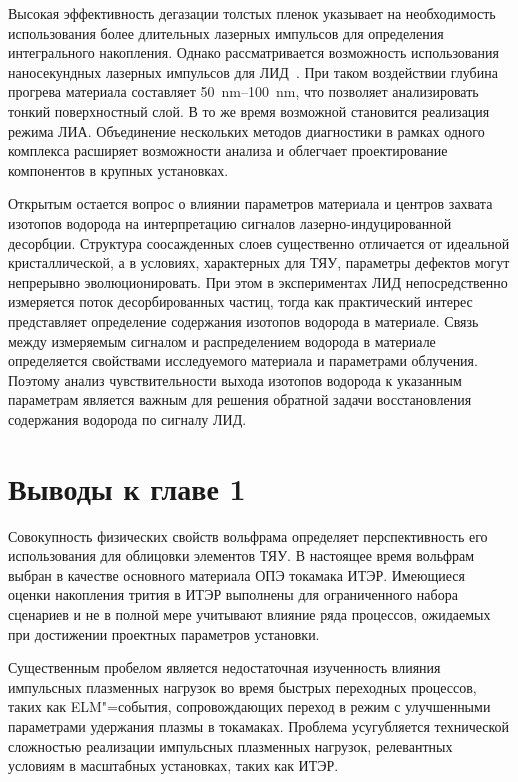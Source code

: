 Высокая эффективность дегазации толстых пленок указывает на необходимость использования более длительных лазерных импульсов для определения интегрального накопления. Однако рассматривается возможность использования наносекундных лазерных импульсов для ЛИД~\cite{Medvedev2024, Gasparyan2021, Efimov2024}. При таком воздействии глубина прогрева материала составляет \SIrange{50}{100}{\nano\meter}, что позволяет анализировать тонкий поверхностный слой. В то же время возможной становится реализация режима ЛИА. Объединение нескольких методов диагностики в рамках одного комплекса расширяет возможности анализа и облегчает проектирование компонентов в крупных установках.

Открытым остается вопрос о влиянии параметров материала и центров захвата изотопов водорода на интерпретацию сигналов лазерно-индуцированной десорбции. Структура соосажденных слоев существенно отличается от идеальной кристаллической, а в условиях, характерных для ТЯУ, параметры дефектов могут непрерывно эволюционировать. При этом в экспериментах ЛИД непосредственно измеряется поток десорбированных частиц, тогда как практический интерес представляет определение содержания изотопов водорода в материале. Связь между измеряемым сигналом и распределением водорода в материале определяется свойствами исследуемого материала и параметрами облучения. Поэтому анализ чувствительности выхода изотопов водорода к указанным параметрам является важным для решения обратной задачи восстановления содержания водорода по сигналу ЛИД.

\section{Выводы к главе 1}

Совокупность физических свойств вольфрама определяет перспективность его использования для облицовки элементов ТЯУ. В настоящее время вольфрам выбран в качестве основного материала ОПЭ токамака ИТЭР. Имеющиеся оценки накопления трития в ИТЭР выполнены для ограниченного набора сценариев и не в полной мере учитывают влияние ряда процессов, ожидаемых при достижении проектных параметров установки.

Существенным пробелом является недостаточная изученность влияния импульсных плазменных нагрузок во время быстрых переходных процессов, таких как ELM"=события, сопровождающих переход в режим с улучшенными параметрами удержания плазмы в токамаках. Проблема усугубляется технической сложностью реализации импульсных плазменных нагрузок, релевантных условиям в масштабных установках, таких как ИТЭР.

